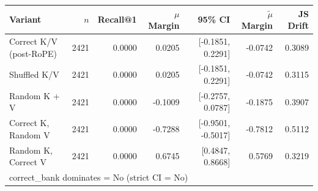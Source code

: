 \begin{tabular}{l r r r r r r}
\toprule
Variant & $n$ & Recall@1 & $\mu$ Margin & 95\% CI & $\tilde{\mu}$ Margin & JS Drift \\
\midrule
Correct K/V (post-RoPE) & 2421 & 0.0000 & 0.0205 & [-0.1851, 0.2291] & -0.0742 & 0.3089 \\
Shuffled K/V & 2421 & 0.0000 & 0.0205 & [-0.1851, 0.2291] & -0.0742 & 0.3115 \\
Random K + V & 2421 & 0.0000 & -0.1009 & [-0.2757, 0.0787] & -0.1875 & 0.3907 \\
Correct K, Random V & 2421 & 0.0000 & -0.7288 & [-0.9501, -0.5017] & -0.7812 & 0.5112 \\
Random K, Correct V & 2421 & 0.0000 & 0.6745 & [0.4847, 0.8668] & 0.5769 & 0.3219 \\
\midrule
\multicolumn{7}{l}{correct\_bank dominates = No (strict CI = No)} \\
\bottomrule
\end{tabular}
